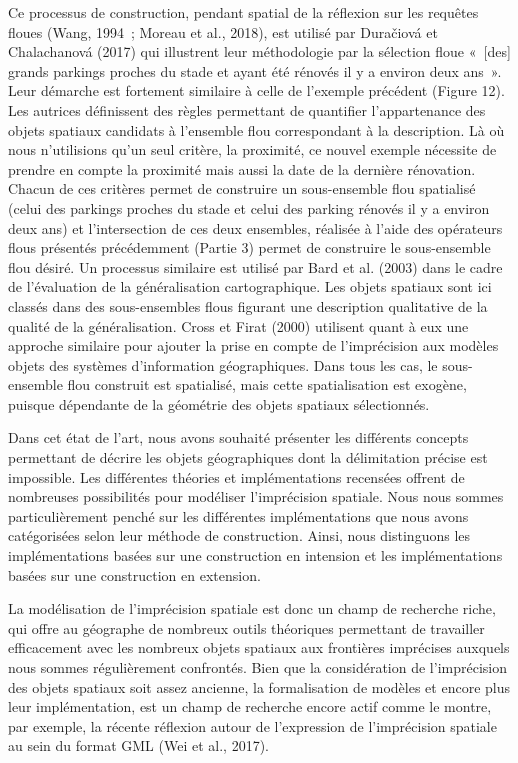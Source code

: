 Ce processus de construction, pendant spatial de la réflexion sur les
requêtes floues (Wang, 1994 ; Moreau et al., 2018), est utilisé par
Duračiová et Chalachanová (2017) qui illustrent leur méthodologie par
la sélection floue « [des] grands parkings proches du stade et ayant
été rénovés il y a environ deux ans ». Leur démarche est fortement
similaire à celle de l’exemple précédent (Figure 12). Les autrices
définissent des règles permettant de quantifier l’appartenance des
objets spatiaux candidats à l’ensemble flou correspondant à la
description. Là où nous n’utilisions qu’un seul critère, la proximité,
ce nouvel exemple nécessite de prendre en compte la proximité mais
aussi la date de la dernière rénovation. Chacun de ces critères permet
de construire un sous-ensemble flou spatialisé (celui des parkings
proches du stade et celui des parking rénovés il y a environ deux ans)
et l’intersection de ces deux ensembles, réalisée à l’aide des
opérateurs flous présentés précédemment (Partie 3) permet de
construire le sous-ensemble flou désiré. Un processus similaire est
utilisé par Bard et al. (2003) dans le cadre de l’évaluation de la
généralisation cartographique. Les objets spatiaux sont ici classés
dans des sous-ensembles flous figurant une description qualitative de
la qualité de la généralisation. Cross et Firat (2000) utilisent quant
à eux une approche similaire pour ajouter la prise en compte de
l’imprécision aux modèles objets des systèmes d’information
géographiques. Dans tous les cas, le sous-ensemble flou construit est
spatialisé, mais cette spatialisation est exogène, puisque dépendante
de la géométrie des objets spatiaux sélectionnés.


Dans cet état de l’art, nous avons souhaité présenter les différents
concepts permettant de décrire les objets géographiques dont la
délimitation précise est impossible. Les différentes théories et
implémentations recensées offrent de nombreuses possibilités pour
modéliser l’imprécision spatiale. Nous nous sommes particulièrement
penché sur les différentes implémentations que nous avons catégorisées
selon leur méthode de construction. Ainsi, nous distinguons les
implémentations basées sur une construction en intension et les
implémentations basées sur une construction en extension.

La modélisation de l’imprécision spatiale est donc un champ de
recherche riche, qui offre au géographe de nombreux outils théoriques
permettant de travailler efficacement avec les nombreux objets
spatiaux aux frontières imprécises auxquels nous sommes régulièrement
confrontés. Bien que la considération de l’imprécision des objets
spatiaux soit assez ancienne, la formalisation de modèles et encore
plus leur implémentation, est un champ de recherche encore actif comme
le montre, par exemple, la récente réflexion autour de l’expression de
l’imprécision spatiale au sein du format GML (Wei et al., 2017).


